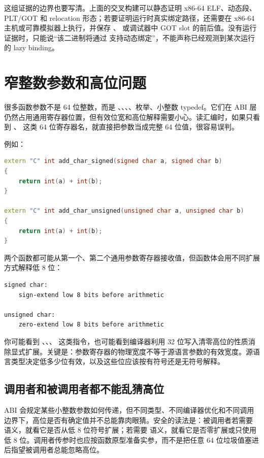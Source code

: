 这组证据的边界也要写清。上面的交叉构建可以静态证明 x86-64 ELF、动态段、PLT/GOT 和 relocation 形态；若要证明运行时真实绑定路径，还需要在 x86-64 主机或可靠模拟器上执行，并保存 、 或调试器中 GOT slot 的前后值。没有运行证据时，只能说“该二进制将通过  支持动态绑定”，不能声称已经观测到某次运行的 lazy binding。

\section{窄整数参数和高位问题}

很多函数参数不是 64 位整数，而是 、、、、枚举、小整数 typedef。它们在 ABI 层仍然占用通用寄存器位置，但有效位宽和高位解释需要小心。读汇编时，如果只看到 、 这类 64 位寄存器名，就直接把参数当成完整 64 位值，很容易误判。

例如：

\begin{lstlisting}[language=C++]
extern "C" int add_char_signed(signed char a, signed char b)
{
    return int(a) + int(b);
}

extern "C" int add_char_unsigned(unsigned char a, unsigned char b)
{
    return int(a) + int(b);
}
\end{lstlisting}

两个函数都可能从第一个、第二个通用参数寄存器接收值，但函数体会用不同扩展方式解释低 8 位：

\begin{lstlisting}
signed char:
    sign-extend low 8 bits before arithmetic

unsigned char:
    zero-extend low 8 bits before arithmetic
\end{lstlisting}

你可能看到 、、、 这类指令，也可能看到编译器利用 32 位写入清零高位的性质消除显式扩展。关键是：参数寄存器的物理宽度不等于源语言参数的有效宽度。源语言类型决定低多少位有效，以及这些位应该按有符号还是无符号解释。

\subsection{调用者和被调用者都不能乱猜高位}

ABI 会规定某些小整数参数如何传递，但不同类型、不同编译器优化和不同调用边界下，高位是否有确定值并不总能靠肉眼猜。安全的读法是：被调用者若需要  语义，就看它是否从低 8 位符号扩展；若需要  语义，就看它是否零扩展或只使用低 8 位。调用者传参时也应按函数原型准备实参，而不是把任意 64 位垃圾值塞进  后指望被调用者总能忽略高位。

